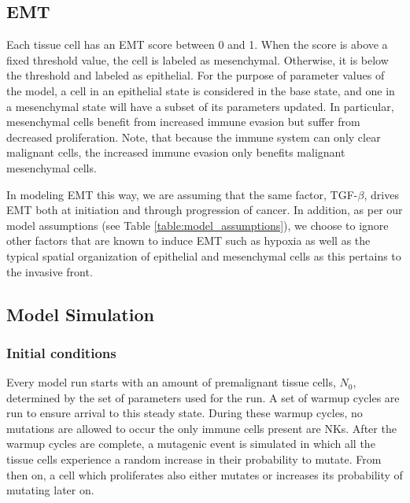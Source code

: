 \documentclass[11pt]{article}
\begin{document}
\subsection{EMT}\label{EMT}
Each tissue cell has an EMT score between 0 and 1.
When the score is above a fixed threshold value, the cell is labeled as mesenchymal.
Otherwise, it is below the threshold and labeled as epithelial.
For the purpose of parameter values of the model, a cell in an epithelial state is considered in the base state, and one in a mesenchymal state will have a subset of its parameters updated.
In particular, mesenchymal cells benefit from increased immune evasion but suffer from decreased proliferation.
Note, that because the immune system can only clear malignant cells, the increased immune evasion only benefits malignant mesenchymal cells.
\par
In modeling EMT this way, we are assuming that the same factor, TGF-$\beta$, drives EMT both at initiation and through progression of cancer.
In addition, as per our model assumptions (see Table \ref{table:model_assumptions}), we choose to ignore other factors that are known to induce EMT such as hypoxia as well as the typical spatial organization of epithelial and mesenchymal cells as this pertains to the invasive front.
\subsection{Model Simulation}

\subsubsection{Initial conditions} 
Every model run starts with an amount of premalignant tissue cells, $N_0$, determined by the set of parameters used for the run.
A set of warmup cycles are run to ensure arrival to this steady state.
During these warmup cycles, no mutations are allowed to occur the only immune cells present are NKs.
After the warmup cycles are complete, a mutagenic event is simulated in which all the tissue cells experience a random increase in their probability to mutate.
From then on, a cell which proliferates also either mutates or increases its probability of mutating later on.
\end{document}
